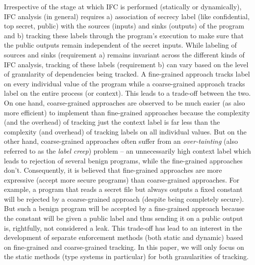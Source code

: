 Irrespective of the stage at which IFC is performed (statically or dynamically), IFC analysis (in
general) requires a) association of secrecy label (like confidential, top secret, public) with the
sources (inputs) and sinks (outputs) of the program and b) tracking these labels through the
program's execution to make sure that the public outputs remain independent of the secret
inputs. While labeling of sources and sinks (requirement a) remains invariant across the different
kinds of IFC analysis, tracking of these labels (requirement b) can vary based on the level of
granularity of dependencies being tracked. A fine-grained approach tracks label on every individual
value of the program while a coarse-grained approach tracks label on the entire process (or
context). This leads to a trade-off between the two. On one hand, coarse-grained approaches are
observed to be much easier (as also more efficient) to implement than fine-grained approaches
because the complexity (and the overhead) of tracking just the context label is far less than the
complexity (and overhead) of tracking labels on all individual values. But on the other hand,
coarse-grained approaches often suffer from an \textit{over-tainting} (also referred to as the
\textit{label creep}) problem -- an unnecessarily high context label which leads to rejection of
several benign programs, while the fine-grained approaches don't. Consequently, it is believed that
fine-grained approaches are more expressive (accept more secure programs) than coarse-grained
approaches. For example, a program that reads a secret file but always outputs a fixed constant will
be rejected by a coarse-grained approach (despite being completely secure). But such a benign
program will be accepted by a fine-grained approach because the constant will be given a public
label and thus sending it on a public output is, rightfully, not considered a leak. This trade-off
has lead to an interest in the development of separate enforcement methods (both static and dynamic)
based on fine-grained and coarse-grained tracking. In this paper, we will only focus on the static
methods (type systems in particular) for both granularities of tracking.


